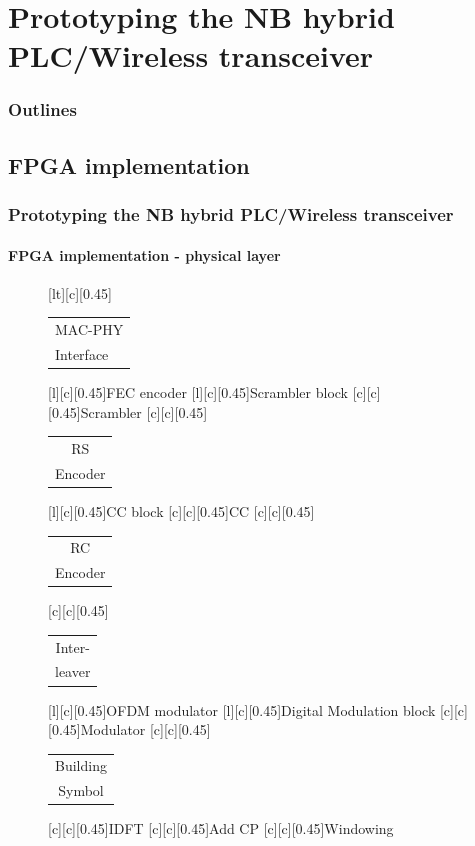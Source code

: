 \documentclass[mathserif]{beamer}
\begin{document}
\section{Prototyping the NB hybrid PLC/Wireless transceiver}
\begin{frame}
	\frametitle{Outlines}
	\small
	\tableofcontents[currentsection]
\end{frame}
\subsection{FPGA implementation}
\begin{frame}
	\frametitle{\normalsize{Prototyping the NB hybrid PLC/Wireless transceiver}}
	\framesubtitle{FPGA implementation - physical layer}
	\renewcommand{\sizeLetter}{0.45}
	\begin{figure}[h]
		\centering
		[lt][c][\sizeLetter]{\begin{tabular}{l}
				MAC-PHY\\Interface
		\end{tabular}}
		[\sizeLetter]{FEC encoder}
		[\sizeLetter]{Scrambler block}	
		[\sizeLetter]{Scrambler}	
		[\sizeLetter]{\begin{tabular}{c}
				RS\\Encoder
		\end{tabular}}
		[\sizeLetter]{CC block}
		[\sizeLetter]{CC}
		[\sizeLetter]{\begin{tabular}{c}
				RC\\Encoder
		\end{tabular}}
		[\sizeLetter]{\begin{tabular}{c}
				Inter-\\leaver
		\end{tabular}}
		[\sizeLetter]{OFDM modulator}
		[\sizeLetter]{Digital Modulation block}
		[\sizeLetter]{Modulator}
		[\sizeLetter]{\begin{tabular}{c}
				Building\\Symbol
		\end{tabular}}
		[\sizeLetter]{IDFT}
		[\sizeLetter]{Add CP}
		[\sizeLetter]{Windowing}

\end{figure}
\end{frame}
\end{document}
